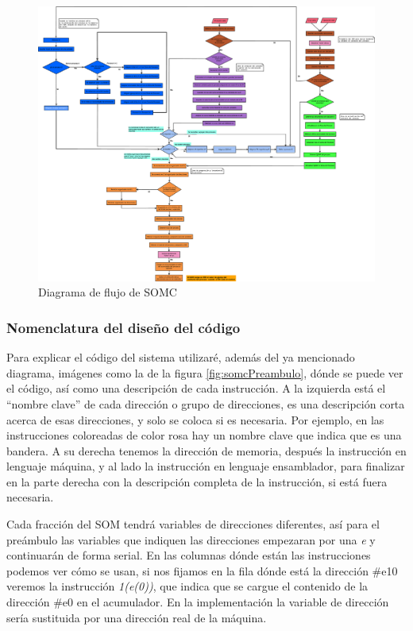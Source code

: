 \documentclass[letterpaper,12pt,oneside]{book}
\begin{document}
		\begin{figure}[p]		
			\centering
			\includegraphics[width=\textwidth,height=\textheight,keepaspectratio]{media/CARDIACC/Diagrama_Flujo_SO.eps}
			\caption{Diagrama de flujo de SOMC}
			\label{fig:diagramaSOMC}
		\end{figure}		
		

		
		\subsubsection{Nomenclatura del diseño del código}
		
		Para explicar el código del sistema utilizaré, además del ya mencionado diagrama, imágenes como la de la figura \ref{fig:somcPreambulo}, dónde
		se puede ver el código, así como una descripción de cada instrucción. A la izquierda está el ``nombre clave'' de cada dirección o grupo
		de direcciones, es una descripción corta acerca de esas direcciones, y solo se coloca si es necesaria. Por ejemplo, en las instrucciones
		coloreadas de color rosa hay un nombre clave que indica que es una bandera. A su derecha tenemos la dirección de memoria, después
		la instrucción en lenguaje máquina, y al lado la instrucción en lenguaje ensamblador, para finalizar en la parte derecha con la descripción completa
		de la instrucción, si está fuera necesaria.
  
        Cada fracción del SOM tendrá variables de direcciones diferentes, así
		para el preámbulo las variables que indiquen las direcciones empezaran por una \textit{e} y continuarán de forma serial. En las columnas
		dónde están las instrucciones podemos ver cómo se usan, si nos fijamos en la fila dónde está la dirección \#e10 veremos la instrucción
		\textit{1(e(0))}, que indica que se cargue el contenido de la dirección \#e0 en el acumulador. En la implementación la variable
		de dirección sería sustituida por una dirección real de la máquina.
		
\end{document}
